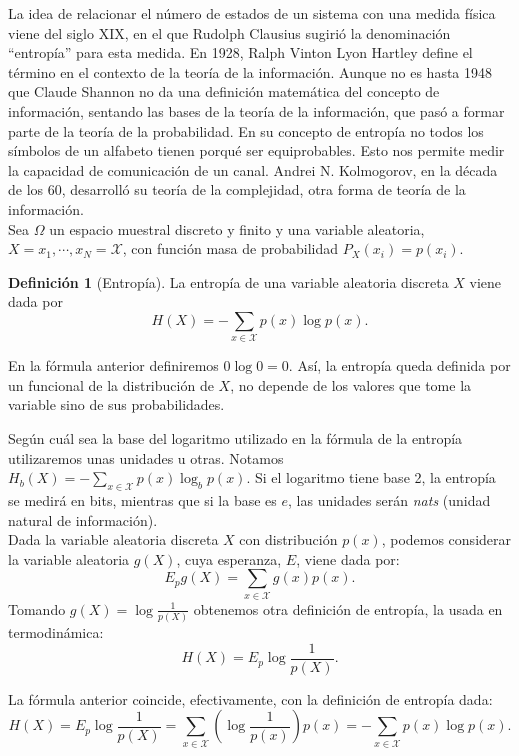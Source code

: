 \documentclass[10pt,a4paper]{article} %
\theoremstyle{definition}
\newtheorem{definition}{Definición}[section]
\begin{document}
    La idea de relacionar el número de estados de un sistema con una medida física viene del siglo XIX, en el que Rudolph Clausius sugirió la denominación ``entropía'' para esta medida. En 1928, Ralph Vinton Lyon Hartley define el término en el contexto de la teoría de la información. Aunque no es hasta 1948 que Claude Shannon no da una definición matemática del concepto de información,  sentando las bases de la teoría de la información, que pasó a formar parte de la teoría de la probabilidad. En su concepto de entropía no todos los símbolos de un alfabeto tienen porqué ser equiprobables. Esto nos permite medir la capacidad de comunicación de un canal. Andrei N. Kolmogorov, en la década de los 60, desarrolló su teoría de la complejidad, otra forma de teoría de la información.\\

Sea $\Omega$ un espacio muestral discreto y finito y una variable aleatoria, $X = x_1, \cdots, x_N = \mathcal{X}$, con función masa de probabilidad $P_X(x_i) = p(x_i)$.

\begin{definition}[Entropía]
  La entropía de una variable aleatoria discreta $X$ viene dada por \[H(X) = - \sum_{x\in \mathcal{X}} p(x) \log p(x).\]
\end{definition}

En la fórmula anterior definiremos $0 \log 0 = 0$. Así, la entropía queda definida por un funcional de la distribución de $X$, no depende de los valores que tome la variable sino de sus probabilidades.

Según cuál sea la base del logaritmo utilizado en la fórmula de la entropía utilizaremos unas unidades u otras. Notamos $H_b(X) = - \sum_{x\in \mathcal{X}} p(x) \log_b p(x)$. Si el logaritmo tiene base 2, la entropía se medirá en bits, mientras que si la base es $e$, las unidades serán \textit{nats} (unidad natural de información).\\

Dada la variable aleatoria discreta $X$ con distribución $p(x)$, podemos considerar la variable aleatoria $g(X)$, cuya esperanza, $E$, viene dada por:\[
E_pg(X) = \sum_{x\in \mathcal{X}}g(x)p(x).
\]
Tomando $g(X) = \log \frac{1}{p(X)}$ obtenemos otra definición de entropía, la usada en termodinámica:\[
H(X) = E_p \log \frac{1}{p(X)}.
\]

La fórmula anterior coincide, efectivamente, con la definición de entropía dada:\[
H(X) = E_p \log \frac{1}{p(X)} = \sum_{x\in \mathcal{X}}\left ( \log \frac{1}{p(x)} \right ) p(x) = - \sum_{x \in \mathcal{X}}p(x)\log p(x).
\]
\end{document}
